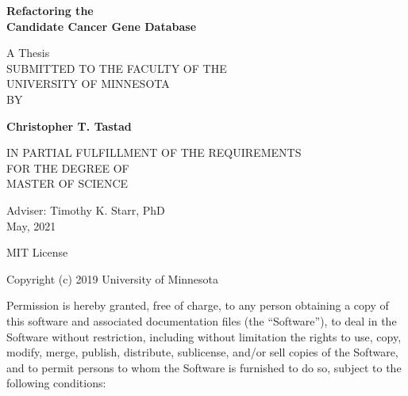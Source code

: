 \documentclass[10pt]{report}
\title{}
\author{Christopher T. Tastad}
\date{day month year}
\begin{document}



\thispagestyle{empty}
\begin{center}
    \vspace*{1cm}

    \Huge
    \textbf{Refactoring the\\Candidate Cancer Gene Database}

    \vspace{1cm}
    \Large
    A Thesis\\
    SUBMITTED TO THE FACULTY OF THE\\
    UNIVERSITY OF MINNESOTA\\
    BY\\

    \vspace{1.5cm}

    \LARGE
    \textbf{Christopher T. Tastad}

    \vspace{3cm}

    \Large
    IN PARTIAL FULFILLMENT OF THE REQUIREMENTS\\
    FOR THE DEGREE OF\\
    MASTER OF SCIENCE\\

    \vspace{1cm}

    Adviser: Timothy K. Starr, PhD\\

    May, 2021

\end{center}

\newpage
\thispagestyle{empty}

MIT License

Copyright (c) 2019 University of Minnesota

Permission is hereby granted, free of charge, to any person obtaining a copy of this software and associated documentation files (the ``Software''), to deal in the Software without restriction, including without limitation the rights to use, copy, modify, merge, publish, distribute, sublicense, and/or sell copies of the Software, and to permit persons to whom the Software is furnished to do so, subject to the following conditions:
\end{document}

